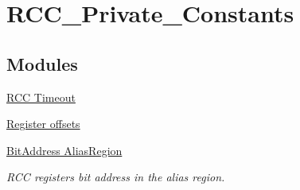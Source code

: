\hypertarget{group___r_c_c___private___constants}{}\section{R\+C\+C\+\_\+\+Private\+\_\+\+Constants}
\label{group___r_c_c___private___constants}
\subsection*{Modules}
\begin{DoxyCompactItemize}
\item 
\hyperlink{group___r_c_c___timeout}{R\+C\+C Timeout}
\item 
\hyperlink{group___r_c_c___register___offset}{Register offsets}
\item 
\hyperlink{group___r_c_c___bit_address___alias_region}{Bit\+Address Alias\+Region}
\begin{DoxyCompactList}\small\item\em R\+CC registers bit address in the alias region. \end{DoxyCompactList}\end{DoxyCompactItemize}
